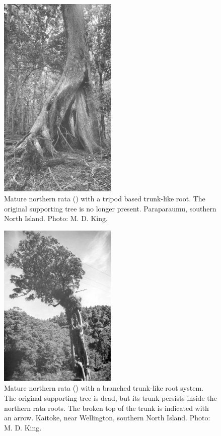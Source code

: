 \begin{figure}
	\includegraphics[width=0.5\textwidth]{graphics/figure51rata.jpg}
	\centering
	\caption[Mature northern rata with a tripod based trunk-like root]{Mature northern rata () with a tripod based trunk-like root.
    The original supporting tree is no longer present.
    Paraparaumu, southern North Island.
	Photo: M. D. King.}
	\label{fig:51rata}
\end{figure}

\begin{figure}
	\includegraphics[width=0.5\textwidth]{graphics/figure52rata-branched.jpg}
	\centering
	\caption[Mature northern rata with a branched trunk-like root system]{Mature northern rata () with a branched trunk-like root system.
The original supporting tree is dead, but its trunk persists inside the northern rata roots.
The broken top of the trunk is indicated with an arrow.
Kaitoke, near Wellington, southern North Island.
	Photo: M. D. King.}
	\label{fig:52rata-branched}
\end{figure}

